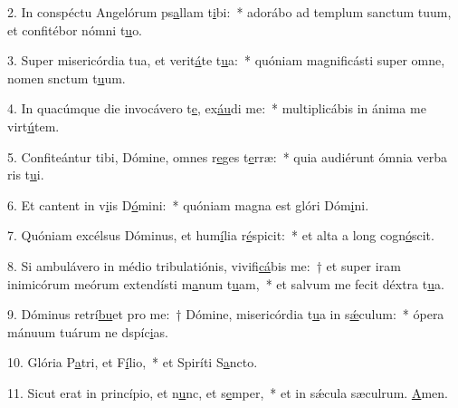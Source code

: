 2. In conspéctu Angelórum ps\uline{a}llam t\uline{i}bi:~* adorábo ad templum sanctum tuum, et confitébor nómni t\uline{u}o.\par 
3. Super misericórdia tua, et verit\uline{á}te t\uline{u}a:~* quóniam magnificásti super omne, nomen snctum t\uline{u}um.\par 
4. In quacúmque die invocávero t\uline{e}, ex\uline{áu}di me:~* multiplicábis in ánima me virt\uline{ú}tem.\par 
5. Confiteántur tibi, Dómine, omnes r\uline{e}ges t\uline{e}rræ:~* quia audiérunt ómnia verba ris t\uline{u}i.\par 
6. Et cantent in v\uline{i}is D\uline{ó}mini:~* quóniam magna est glóri Dóm\uline{i}ni.\par 
7. Quóniam excélsus Dóminus, et hum\uline{í}lia r\uline{é}spicit:~* et alta a long cogn\uline{ó}scit.\par 
8. Si ambulávero in médio tribulatiónis, vivifi\uline{cá}bis me:~† et super iram inimicórum meórum extendísti m\uline{a}num t\uline{u}am,~* et salvum me fecit déxtra t\uline{u}a.\par 
9. Dóminus retrí\uline{bu}et pro me:~† Dómine, misericórdia t\uline{u}a in s\uline{ǽ}culum:~* ópera mánuum tuárum ne dspíc\uline{i}as.\par 
10. Glória P\uline{a}tri, et F\uline{í}lio,~* et Spiríti S\uline{a}ncto.\par 
11. Sicut erat in princípio, et n\uline{u}nc, et s\uline{e}mper,~* et in sǽcula sæculrum. \uline{A}men.\par 
